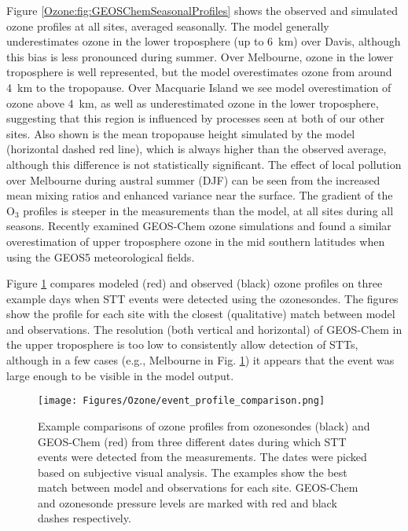   Figure \ref{Ozone:fig:GEOSChemSeasonalProfiles} shows the observed and simulated ozone profiles at all sites, averaged seasonally.
  The model generally underestimates ozone in the lower troposphere (up to 6~km) over Davis, although this bias is less pronounced during summer.
  Over Melbourne, ozone in the lower troposphere is well represented, but the model overestimates ozone from around 4~km to the tropopause.
  Over Macquarie Island we see model overestimation of ozone above 4~km, as well as underestimated ozone in the lower troposphere, suggesting that this region is influenced by processes seen at both of our other sites.
  Also shown is the mean tropopause height simulated by the model (horizontal dashed red line), which is always higher than the observed average, although this difference is not statistically significant.
  The effect of local pollution over Melbourne during austral summer (DJF) can be seen from the increased mean mixing ratios and enhanced variance near the surface.
  The gradient of the O$_3$ profiles is steeper in the measurements than the model, at all sites during all seasons.
  Recently \cite{Hu2017} examined GEOS-Chem ozone simulations and found a similar overestimation of upper troposphere ozone in the mid southern latitudes when using the GEOS5 meteorological fields.
  
  Figure \ref{Ozone:fig:event_profile_comparison} compares modeled (red) and observed (black) ozone profiles on three example days when STT events were detected using the ozonesondes. 
  The figures show the profile for each site with the closest (qualitative) match between model and observations.
  The resolution (both vertical and horizontal) of GEOS-Chem in the upper troposphere is too low to consistently allow detection of STTs, although in a few cases (e.g., Melbourne in Fig. \ref{Ozone:fig:event_profile_comparison}) it appears that the event was large enough to be visible in the model output.
  
  \begin{figure}
    \texttt{[image: Figures/Ozone/event\_profile\_comparison.png]}
    \caption{%
      Example comparisons of ozone profiles from ozonesondes (black) and GEOS-Chem (red) from three different dates during which STT events were detected from the measurements.
      The dates were picked based on subjective visual analysis. 
      The examples show the best match between model and observations for each site.
      GEOS-Chem and ozonesonde pressure levels are marked with red and black dashes respectively.}
    \label{Ozone:fig:event_profile_comparison}
  \end{figure}
  
